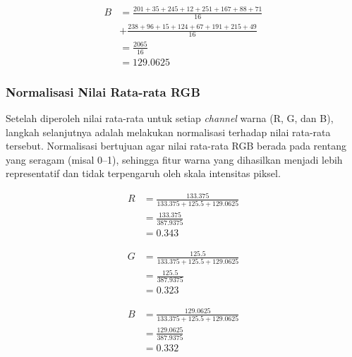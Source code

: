 \begin{equation*}
\begin{split}
B &= \frac{201 + 35 + 245 + 12 + 251 + 167 + 88 + 71}{16} \\
  &+ \frac{238 + 96 + 15 + 124 + 67 + 191 + 215 + 49}{16} \\
  &= \frac{2065}{16} \\
  &= 129.0625
\end{split}
\end{equation*}

\subsubsection{Normalisasi Nilai Rata-rata RGB} \label{III.Normalisasi Nilai Rata-rata RGB}
Setelah diperoleh nilai rata-rata untuk setiap \textit{channel} warna (R, G, dan B), langkah selanjutnya adalah melakukan normalisasi terhadap nilai rata-rata tersebut. Normalisasi bertujuan agar nilai rata-rata RGB berada pada rentang yang seragam (misal 0–1), sehingga fitur warna yang dihasilkan menjadi lebih representatif dan tidak terpengaruh oleh skala intensitas piksel.

\begin{equation*}
\begin{aligned}
R &= \frac{133.375}{133.375 + 125.5 + 129.0625} \\
  &= \frac{133.375}{387.9375} \\
  &= 0.343
\end{aligned}
\end{equation*}

\begin{equation*}
\begin{aligned}
G &= \frac{125.5}{133.375 + 125.5 + 129.0625} \\
  &= \frac{125.5}{387.9375} \\
  &= 0.323
\end{aligned}
\end{equation*}

\begin{equation*}
\begin{aligned}
B &= \frac{129.0625}{133.375 + 125.5 + 129.0625} \\
  &= \frac{129.0625}{387.9375} \\
  &= 0.332
\end{aligned}
\end{equation*}


